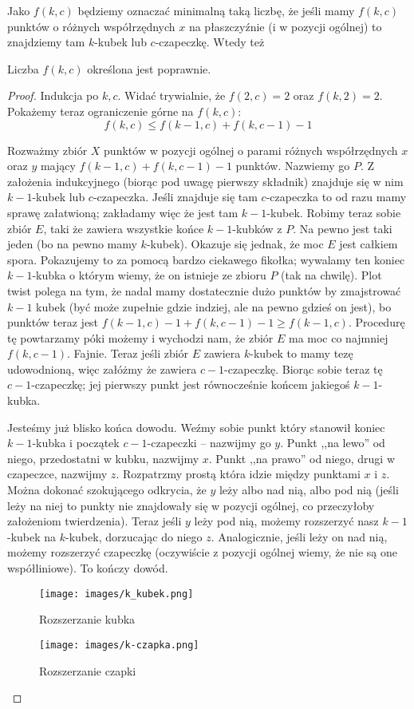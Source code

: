 Jako $f(k,c)$ będziemy oznaczać minimalną taką liczbę, że jeśli mamy $f(k,c)$ punktów o różnych współrzędnych $x$ na płaszczyźnie (i w pozycji ogólnej) to znajdziemy tam $k$-kubek lub $c$-czapeczkę. Wtedy też
\begin{theorem}
	Liczba $f(k,c)$ określona jest poprawnie.
\end{theorem}
\begin{proof}
	Indukcja po $k,c$. Widać trywialnie, że  $f(2,c) = 2$ oraz $f(k,2) = 2$. Pokażemy teraz ograniczenie górne na $f(k,c)$: \begin{equation*}
		f(k,c) \leq f(k-1,c) + f(k, c-1) - 1
	\end{equation*}

	Rozważmy zbiór $X$ punktów w pozycji ogólnej o parami różnych współrzędnych $x$ oraz $y$ mający $f(k-1,c) + f(k, c-1) - 1$ punktów. Nazwiemy go $P$.
	Z założenia indukcyjnego (biorąc pod uwagę pierwszy składnik) znajduje się w nim $k-1$-kubek lub $c$-czapeczka. Jeśli znajduje się tam $c$-czapeczka to od razu mamy sprawę załatwioną; zakładamy więc że jest tam $k-1$-kubek. Robimy teraz sobie zbiór $E$, taki że zawiera wszystkie końce $k-1$-kubków z $P$. Na pewno jest taki jeden (bo na pewno mamy $k$-kubek). Okazuje się jednak, że moc $E$ jest całkiem spora.
	Pokazujemy to za pomocą bardzo ciekawego fikołka; wywalamy ten koniec $k-1$-kubka o którym wiemy, że on istnieje ze zbioru $P$ (tak na chwilę). Plot twist polega na tym, że nadal mamy dostatecznie dużo punktów by zmajstrować $k-1$ kubek (być może zupełnie gdzie indziej, ale na pewno gdzieś on jest), bo punktów teraz jest $f(k-1,c) - 1 + f(k, c-1) - 1 \geq f(k-1,c)$. Procedurę tę powtarzamy póki możemy i wychodzi nam, że zbiór $E$ ma moc co najmniej $f(k,c-1)$.
	Fajnie. Teraz jeśli zbiór $E$ zawiera $k$-kubek to mamy tezę udowodnioną, więc załóżmy że zawiera $c-1$-czapeczkę. Biorąc sobie teraz tę $c-1$-czapeczkę; jej pierwszy punkt jest równocześnie końcem jakiegoś $k-1$-kubka.

	Jesteśmy już blisko końca dowodu. Weźmy sobie punkt który stanowił koniec $k-1$-kubka i początek $c-1$-czapeczki -- nazwijmy go $y$. Punkt ,,na lewo'' od niego, przedostatni w kubku, nazwijmy $x$. Punkt ,,na prawo'' od niego, drugi w czapeczce, nazwijmy $z$. Rozpatrzmy prostą która idzie między punktami $x$ i $z$. Można dokonać szokującego odkrycia, że $y$ leży albo nad nią, albo pod nią (jeśli leży na niej to punkty nie znajdowały się w pozycji ogólnej, co przeczyłoby założeniom twierdzenia). Teraz jeśli $y$ leży pod nią, możemy rozszerzyć nasz $k-1$-kubek na $k$-kubek, dorzucając do niego $z$.
	Analogicznie, jeśli leży on nad nią, możemy rozszerzyć czapeczkę (oczywiście z pozycji ogólnej wiemy, że nie są one współliniowe). To kończy dowód.

	\begin{figure}[H]
		\centering
		\texttt{[image: images/k\_kubek.png]}
		\caption{Rozszerzanie kubka}
	\end{figure}


	\begin{figure}[H]
		\centering
		\texttt{[image: images/k-czapka.png]}
		\caption{Rozszerzanie czapki}
	\end{figure}
\end{proof}
